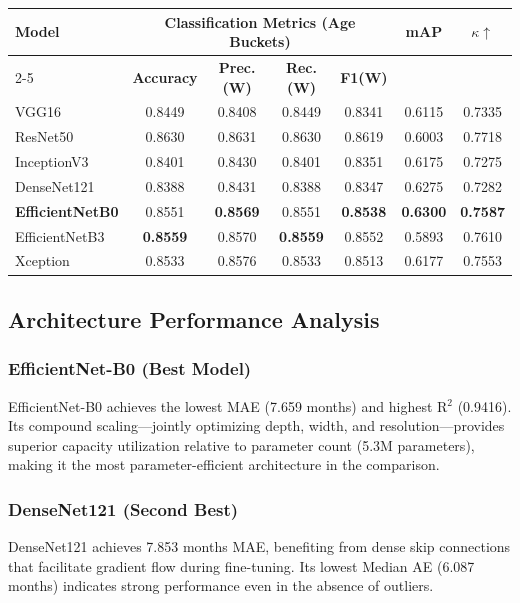 \documentclass[conference]{IEEEtran}
\begin{document}
\begin{table}[t]
\begin{tabular}{lcccccc}
\toprule
\multirow{2}{*}{\textbf{Model}} &
\multicolumn{4}{c}{\textbf{Classification Metrics (Age Buckets)}} &
\multirow{2}{*}{\textbf{mAP}} &
\multirow{2}{*}{\textbf{$\kappa$$\uparrow$}} \\
\cmidrule(lr){2-5}
 & \textbf{Accuracy} & \textbf{Prec.(W)} & \textbf{Rec.(W)} & \textbf{F1(W)} & & \\
\midrule
VGG16           & 0.8449 & 0.8408 & 0.8449 & 0.8341 & 0.6115 & 0.7335 \\
ResNet50        & 0.8630 & 0.8631 & 0.8630 & 0.8619 & 0.6003 & 0.7718 \\
InceptionV3     & 0.8401 & 0.8430 & 0.8401 & 0.8351 & 0.6175 & 0.7275 \\
DenseNet121     & 0.8388 & 0.8431 & 0.8388 & 0.8347 & 0.6275 & 0.7282 \\
\textbf{EfficientNetB0} & 0.8551 & \textbf{0.8569} & 0.8551 & \textbf{0.8538} & \textbf{0.6300} & \textbf{0.7587} \\
EfficientNetB3  & \textbf{0.8559} & 0.8570 & \textbf{0.8559} & 0.8552 & 0.5893 & 0.7610 \\
Xception        & 0.8533 & 0.8576 & 0.8533 & 0.8513 & 0.6177 & 0.7553 \\
\bottomrule
\end{tabular}
\end{table}

\subsection{Architecture Performance Analysis}

\subsubsection{EfficientNet-B0 (Best Model)}
EfficientNet-B0 achieves the lowest MAE (7.659 months) and highest
R$^2$ (0.9416). Its compound scaling—jointly optimizing depth, width,
and resolution—provides superior capacity utilization relative to
parameter count (5.3M parameters), making it the most parameter-efficient
architecture in the comparison.

\subsubsection{DenseNet121 (Second Best)}
DenseNet121 achieves 7.853 months MAE, benefiting from dense skip
connections that facilitate gradient flow during fine-tuning. Its
lowest Median AE (6.087 months) indicates strong performance even
in the absence of outliers.
\end{document}
